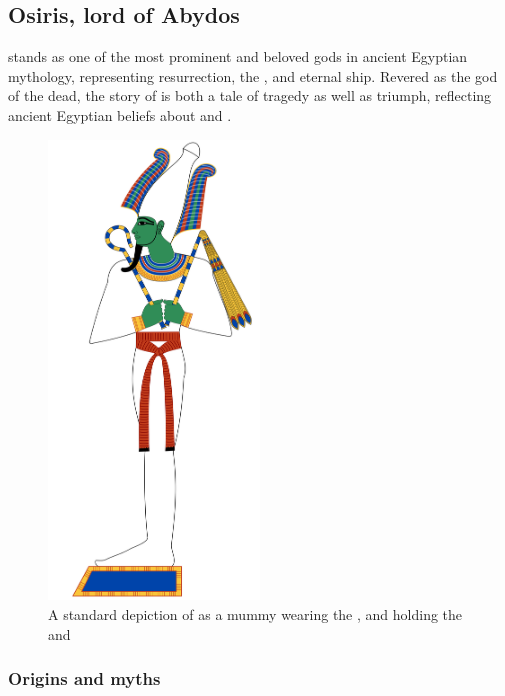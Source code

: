 \subsection*{Osiris, lord of Abydos}

 stands as one of the most prominent and beloved gods in ancient Egyptian mythology, representing resurrection, the , and eternal ship. Revered as the god of the dead, the story of  is both a tale of tragedy as well as triumph, reflecting ancient Egyptian beliefs about  and .

\begin{figure} [H]
	\centering
	\includegraphics[width=0.5\textwidth]{../images/osiris}
	\caption{A standard depiction of  as a mummy wearing the  , and holding the  and }
\end{figure}

\subsubsection*{Origins and myths}

